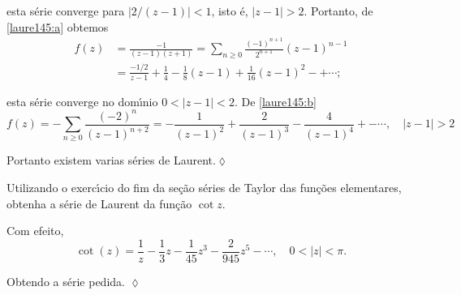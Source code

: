 esta s\'{e}rie converge para $|2/(z - 1)| < 1$, isto \'{e}, $|z - 1|>2$.
Portanto, de \eqref{laure145:a} obtemos
\begin{align*}
f(z) &=\frac{-1}{(z-1)(z+1)}=\sum_{n\geq 0}\frac{(-1)^{n+1}}{2^{n+1}}(z-1)^{n-1}\\[2ex]
   &=\frac{-1/2}{z-1}+\frac{1}{4}-\frac{1}{8}(z-1)+\frac{1}{16}(z-1)^2-+\cdots;
\end{align*}

esta s\'{e}rie converge no dom\'{\i}nio $0 < | z - 1| < 2$. De
\eqref{laure145:b}
\begin{equation*}
f(z) =-\sum_{n\geq
0}\frac{(-2)^{n}}{(z-1)^{n+2}}=-\frac{1}{(z-1)^2}+\frac{2}{(z-1)^3}-
\frac{4}{(z-1)^4}+-\cdots,
\quad |z-1|>2
\end{equation*}

Portanto existem varias s\'{e}ries de Laurent.\hfill \(\lozenge\)

\begin{exer}\label{xe145:3}
Utilizando o exerc\'{\i}cio do fim da se\c{c}\~{a}o s\'{e}ries de Taylor das
fun\c{c}\~{o}es elementares, obtenha a s\'{e}rie de Laurent da fun\c{c}\~{a}o $\cot
z$.
\end{exer}

\solo Com efeito,
\begin{equation*}
\cot(z)
=\frac{1}{z}-\frac{1}{3}z-\frac{1}{45}z^3-\frac{2}{945}z^5-\cdots,\quad
0<|z|<\pi.
\end{equation*}

Obtendo a s\'{e}rie pedida. \hfill \(\lozenge\)

